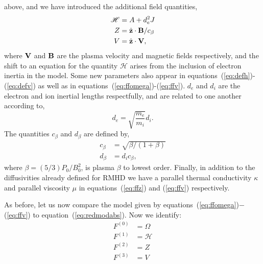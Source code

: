 \documentclass[12pt, letterpaper, oneside, leqno, openright]{memoir}
\newcommand{\hfield}{\mathscr{H}}
\begin{document}
above, and we have introduced the additional field quantities,
%
\begin{subequations}
  \begin{align}
    \hfield &= A + d_e^2 J               \label{eq:defh} \\
     Z      &= \zhat\cdot \Bvec/c_\beta  \label{eq:defz} \\
     V      &= \zhat\cdot \Vvec,         \label{eq:defv}
  \end{align}
\end{subequations}
%
where $\mathbf{V}$ and $\mathbf{B}$ are the plasma velocity and magnetic
fields respectively, and the shift to an equation for the
quantity $\hfield$ arises from the inclusion of electron inertia
in the model. Some new parameters also appear in
equations~(\ref{eq:defh})-(\ref{eq:defv}) as well as in
equations~(\ref{eq:ffomega})-(\ref{eq:ffv}). $d_e$  and
$d_i$ are the electron and ion inertial lengths
respectfully, and are related to one another according to,
%
\begin{equation}
  d_e=\sqrt{\frac{m_e}{m_i}} d_i.
\end{equation}
%
The quantities $c_\beta$ and $d_\beta$ are defined by,
%
\begin{subequations}
  \begin{align}
    c_\beta &= \sqrt{\beta/(1+\beta)} \label{eq:defcbeta} \\
    d_\beta &= d_i c_\beta,           \label{eq:defdbeta}
  \end{align}
\end{subequations}
%
where $\beta=(5/3)P_0/B_0^2$, is plasma $\beta$ to lowest order.
Finally, in addition to the diffusivities already defined for RMHD
we have a parallel thermal conductivity $\kappa$ and parallel
viscosity $\mu$ in equations~(\ref{eq:ffz}) and (\ref{eq:ffv})
respectively.
%
\par
%
As before, let us now compare the model given by 
equations~(\ref{eq:ffomega})$-$(\ref{eq:ffv}) to 
equation~(\ref{eq:redmodabs}). Now we identify:
%
\begin{subequations}
\begin{align}
  F^{(0)}                        &= \Omega                                                                             \label{eq:ffzero} \\
  F^{(1)}                        &=  \hfield                                                                           \label{eq:ffone}  \\
  F^{(2)}                        &=  Z                                                                                 \label{eq:fftwo}  \\
  F^{(3)}                        &=  V                                                                                 \label{eq:ffthree}
\end{align}
\end{subequations}
\end{document}
